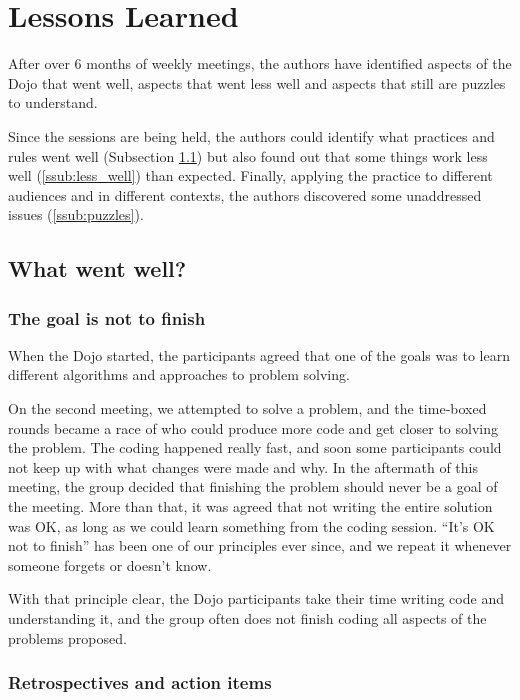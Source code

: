 \section{Lessons Learned}\label{sec:lessons_learned}

After over 6 months of weekly meetings, the authors have identified
aspects of the Dojo that went well, aspects that went less well and
aspects that still are puzzles to understand.

Since the sessions are being held, the authors could identify what
practices and rules went well (Subsection \ref{ssub:well}) but also
found out that some things work less well (\ref{ssub:less_well}) than
expected. Finally, applying the practice to different audiences and in
different contexts, the authors discovered some unaddressed issues
(\ref{ssub:puzzles}).

\subsection{What went well?}\label{ssub:well}

\subsubsection{The goal is not to finish}

When the Dojo started, the participants agreed that one of the goals
was to learn different algorithms and approaches to problem solving.

On the second meeting, we attempted to solve a problem, and the
time-boxed rounds became a race of who could produce more code and get
closer to solving the problem. The coding happened really fast, and
soon some participants could not keep up with what changes were made
and why. In the aftermath of this meeting, the group decided that
finishing the problem should never be a goal of the meeting. More than
that, it was agreed that not writing the entire solution was OK, as
long as we could learn something from the coding session. ``It's OK
not to finish'' has been one of our principles ever since, and we
repeat it whenever someone forgets or doesn't know.

With that principle clear, the Dojo participants take their time
writing code and understanding it, and the group often does not finish
coding all aspects of the problems proposed.

\subsubsection{Retrospectives and action items}

